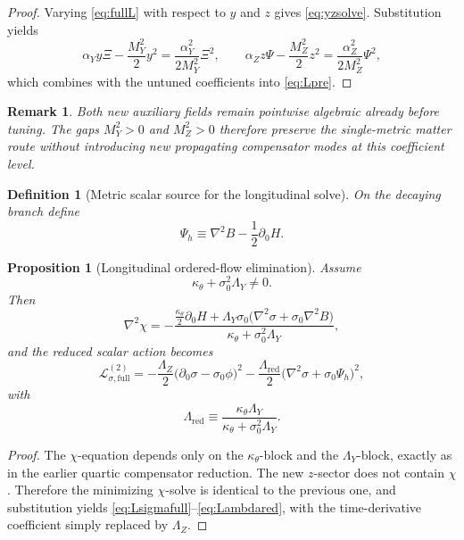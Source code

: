 \documentclass[11pt]{article}
\newtheorem{definition}{Definition}
\newtheorem{proposition}{Proposition}
\newtheorem{remark}{Remark}
\begin{document}
\begin{proof}
Varying \eqref{eq:fullL} with respect to \(y\) and \(z\) gives \eqref{eq:yzsolve}. Substitution yields
\[
\alpha_Yy\Xi-\frac{M_Y^2}{2}y^2
=
\frac{\alpha_Y^2}{2M_Y^2}\Xi^2,
\qquad
\alpha_Zz\Psi-\frac{M_Z^2}{2}z^2
=
\frac{\alpha_Z^2}{2M_Z^2}\Psi^2,
\]
which combines with the untuned coefficients into \eqref{eq:Lpre}.
\end{proof}

\begin{remark}
Both new auxiliary fields remain pointwise algebraic already before tuning. The gaps \(M_Y^2>0\) and \(M_Z^2>0\) therefore preserve the single-metric matter route without introducing new propagating compensator modes at this coefficient level.
\end{remark}

\begin{definition}[Metric scalar source for the longitudinal solve]
\label{def:Psih}
On the decaying branch define
\begin{equation}
\Psi_h
\equiv
\nabla^2B-\frac12\partial_0H.
\label{eq:Psih}
\end{equation}
\end{definition}

\begin{proposition}[Longitudinal ordered-flow elimination]
\label{prop:chisolve}
Assume
\begin{equation}
\kappa_\theta+\sigma_0^2\Lambda_Y\neq 0.
\label{eq:denom}
\end{equation}
Then
\begin{equation}
\nabla^2\chi
=
-\frac{
\frac{\kappa_\theta}{2}\partial_0H
+\Lambda_Y\sigma_0\bigl(\nabla^2\sigma+\sigma_0\nabla^2B\bigr)
}{
\kappa_\theta+\sigma_0^2\Lambda_Y
},
\label{eq:chisolve}
\end{equation}
and the reduced scalar action becomes
\begin{equation}
\mathcal L_{\sigma,\mathrm{full}}^{(2)}
=
-\frac{\Lambda_Z}{2}\bigl(\partial_0\sigma-\sigma_0\phi\bigr)^2
-\frac{\Lambda_{\mathrm{red}}}{2}
\bigl(\nabla^2\sigma+\sigma_0\Psi_h\bigr)^2,
\label{eq:Lsigmafull}
\end{equation}
with
\begin{equation}
\Lambda_{\mathrm{red}}
\equiv
\frac{\kappa_\theta\Lambda_Y}
{\kappa_\theta+\sigma_0^2\Lambda_Y}.
\label{eq:Lambdared}
\end{equation}
\end{proposition}

\begin{proof}
The \(\chi\)-equation depends only on the \(\kappa_\theta\)-block and the \(\Lambda_Y\)-block, exactly as in the earlier quartic compensator reduction. The new \(z\)-sector does not contain \(\chi\). Therefore the minimizing \(\chi\)-solve is identical to the previous one, and substitution yields \eqref{eq:Lsigmafull}--\eqref{eq:Lambdared}, with the time-derivative coefficient simply replaced by \(\Lambda_Z\).
\end{proof}
\end{document}
